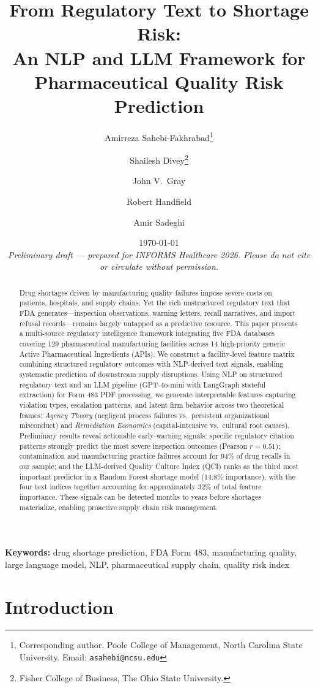 \documentclass[12pt]{article}
\title{\textbf{From Regulatory Text to Shortage Risk:\\
  An NLP and LLM Framework for Pharmaceutical Quality Risk Prediction}}
\author{
  Amirreza Sahebi-Fakhrabad\thanks{Corresponding author.
    Poole College of Management, North Carolina State University.
    Email: \texttt{asahebi@ncsu.edu}} \and
  Shailesh Divey\thanks{Fisher College of Business, The Ohio State University.} \and
  John V.\ Gray\footnotemark[2] \and
  Robert Handfield\footnotemark[1] \and
  Amir Sadeghi\footnotemark[1]
}
\date{\today \\ \vspace{4pt}
  \textit{Preliminary draft — prepared for INFORMS Healthcare 2026.
  Please do not cite or circulate without permission.}}
\begin{document}
\maketitle

\begin{abstract}
Drug shortages driven by manufacturing quality failures impose severe costs on patients,
hospitals, and supply chains.
Yet the rich unstructured regulatory text that FDA generates---inspection observations,
warning letters, recall narratives, and import refusal records---remains largely
untapped as a predictive resource.
This paper presents a multi-source regulatory intelligence framework integrating five
FDA databases covering 129 pharmaceutical manufacturing facilities across 14
high-priority generic Active Pharmaceutical Ingredients (APIs).
We construct a facility-level feature matrix combining structured regulatory outcomes
with NLP-derived text signals, enabling systematic prediction of downstream supply
disruptions.
Using NLP on structured regulatory text and an LLM pipeline (GPT-4o-mini with
LangGraph stateful extraction) for Form 483 PDF processing, we generate
interpretable features capturing violation types, escalation patterns, and latent
firm behavior across two theoretical frames: \emph{Agency Theory} (negligent process
failures vs.\ persistent organizational misconduct) and \emph{Remediation Economics}
(capital-intensive vs.\ cultural root causes).
Preliminary results reveal actionable early-warning signals: specific regulatory
citation patterns strongly predict the most severe inspection outcomes
(Pearson $r = 0.51$); contamination and manufacturing practice failures account for
94\% of drug recalls in our sample; and the LLM-derived Quality Culture Index (QCI)
ranks as the third most important predictor in a Random Forest shortage model
(14.8\% importance), with the four text indices together accounting for approximately
32\% of total feature importance.
These signals can be detected months to years before shortages materialize, enabling
proactive supply chain risk management.
\end{abstract}

\textbf{Keywords:} drug shortage prediction, FDA Form 483, manufacturing quality,
large language model, NLP, pharmaceutical supply chain, quality risk index

\newpage

\section{Introduction}
\label{sec:intro}
\end{document}
